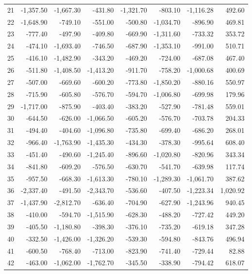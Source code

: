 \begin{longtable}{rrrrrrrr}
21 & -1,357.50 & -1,667.30 & -431.80 & -1,321.70 & -803.10 & -1,116.28 & 492.60  \\
22 & -1,648.90 & -749.10 & -551.00 & -500.80 & -1,034.70 & -896.90 & 469.81  \\
23 & -777.40 & -497.90 & -409.80 & -669.90 & -1,311.60 & -733.32 & 353.72  \\
24 & -474.10 & -1,693.40 & -746.50 & -687.90 & -1,353.10 & -991.00 & 510.71  \\
25 & -416.10 & -1,482.90 & -343.20 & -469.20 & -724.00 & -687.08 & 467.40  \\
26 & -511.80 & -1,408.50 & -1,413.20 & -911.70 & -758.20 & -1,000.68 & 400.69  \\
27 & -507.00 & -669.60 & -600.20 & -773.80 & -1,850.20 & -880.16 & 550.97  \\
28 & -715.90 & -605.80 & -576.70 & -594.70 & -1,006.80 & -699.98 & 179.96  \\
29 & -1,717.00 & -875.90 & -403.40 & -383.20 & -527.90 & -781.48 & 559.01  \\
30 & -644.50 & -626.00 & -1,066.50 & -605.20 & -576.70 & -703.78 & 204.33  \\
31 & -494.40 & -404.60 & -1,096.80 & -735.80 & -699.40 & -686.20 & 268.01  \\
32 & -966.40 & -1,763.90 & -1,435.30 & -434.30 & -378.30 & -995.64 & 608.40  \\
33 & -451.40 & -490.60 & -1,245.40 & -896.60 & -1,020.80 & -820.96 & 343.34  \\
34 & -841.80 & -609.20 & -576.50 & -630.70 & -541.70 & -639.98 & 117.74  \\
35 & -957.50 & -668.30 & -1,613.30 & -780.10 & -1,289.30 & -1,061.70 & 387.62  \\
36 & -2,337.40 & -491.50 & -2,343.70 & -536.60 & -407.50 & -1,223.34 & 1,020.92  \\
37 & -1,437.90 & -2,812.70 & -636.40 & -704.90 & -627.90 & -1,243.96 & 940.45  \\
38 & -410.00 & -594.70 & -1,515.90 & -628.30 & -488.20 & -727.42 & 449.20  \\
39 & -405.50 & -1,180.80 & -398.30 & -376.10 & -735.20 & -619.18 & 347.28  \\
40 & -332.50 & -1,426.00 & -1,326.20 & -539.30 & -594.80 & -843.76 & 496.94  \\
41 & -600.50 & -768.40 & -713.00 & -823.90 & -741.40 & -729.44 & 82.88  \\
42 & -463.00 & -1,062.00 & -1,762.70 & -345.50 & -338.90 & -794.42 & 618.07  \\

\end{longtable}
